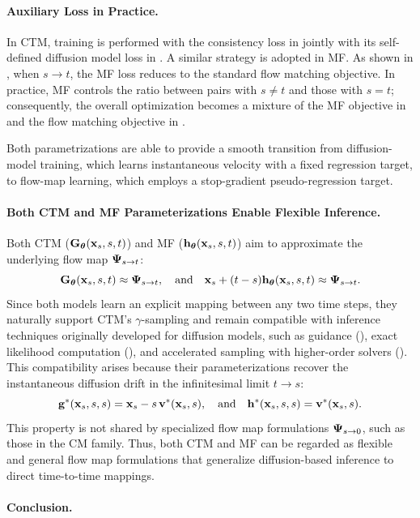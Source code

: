 \paragraph{Auxiliary Loss in Practice.}
In CTM, training is performed with the consistency loss in  jointly with its self-defined diffusion model loss in . A similar strategy is adopted in MF. As shown in , when $s \to t$, the MF loss reduces to the standard flow matching objective. In practice, MF controls the ratio between pairs with $s \neq t$ and those with $s = t$; consequently, the overall optimization becomes a mixture of the MF objective in  and the flow matching objective in . 

Both parametrizations are able to provide a smooth transition from diffusion-model training, which learns instantaneous velocity with a fixed regression target, to flow-map learning, which employs a stop-gradient pseudo-regression target.


\paragraph{Both CTM and MF Parameterizations Enable Flexible Inference.}
Both CTM (${\mathbf{G}}_{\bm{\theta}}({\mathbf{x}}_s,s,t)$) and MF (${\mathbf{h}}_{\bm{\theta}}({\mathbf{x}}_s,s,t)$) aim to approximate the underlying flow map ${\bm{\Psi}}_{s\to t}$:
\[
{\mathbf{G}}_{\bm{\theta}}({\mathbf{x}}_s,s,t)\approx{\bm{\Psi}}_{s\to t},\quad  \text{and}
\quad 
{\mathbf{x}}_s+(t-s){\mathbf{h}}_{\bm{\theta}}({\mathbf{x}}_s,s,t)\approx{\bm{\Psi}}_{s\to t}.
\]
Since both models learn an explicit mapping between any two time steps, they naturally support CTM’s $\gamma$-sampling and remain compatible with inference techniques originally developed for diffusion models, such as guidance (), exact likelihood computation (), and accelerated sampling with higher-order solvers (). 
This compatibility arises because their parameterizations recover the instantaneous diffusion drift in the infinitesimal limit $t\to s$:
\[
{\mathbf{g}}^*({\mathbf{x}}_s,s,s)={\mathbf{x}}_s-s\,{\mathbf{v}}^*({\mathbf{x}}_s,s),
\quad  \text{and}
\quad 
{\mathbf{h}}^*({\mathbf{x}}_s,s,s)={\mathbf{v}}^*({\mathbf{x}}_s,s).
\]
This property is not shared by specialized flow map formulations ${\bm{\Psi}}_{s\to0}$, such as those in the CM family. Thus, both CTM and MF can be regarded as flexible and general flow map formulations that generalize diffusion-based inference to direct time-to-time mappings.




\paragraph{Conclusion.}


